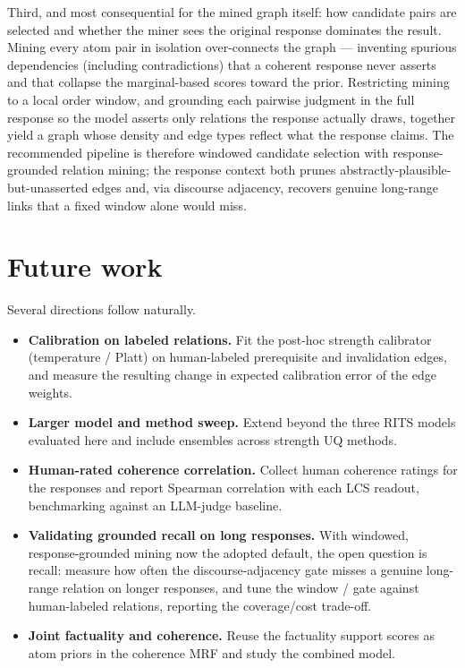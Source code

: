 \documentclass[11pt]{article}
\begin{document}
Third, and most consequential for the mined graph itself: how candidate pairs are
selected and whether the miner sees the original response dominates the result.
Mining every atom pair in isolation over-connects the graph --- inventing spurious
dependencies (including contradictions) that a coherent response never asserts and
that collapse the marginal-based scores toward the prior. Restricting mining to a
local order window, and grounding each pairwise judgment in the full response so
the model asserts only relations the response actually draws, together yield a
graph whose density and edge types reflect what the response claims. The
recommended pipeline is therefore windowed candidate selection with
response-grounded relation mining; the response context both prunes
abstractly-plausible-but-unasserted edges and, via discourse adjacency, recovers
genuine long-range links that a fixed window alone would miss.

\section{Future work}

Several directions follow naturally.
\begin{itemize}
  \item \textbf{Calibration on labeled relations.} Fit the post-hoc strength
        calibrator (temperature / Platt) on human-labeled prerequisite and
        invalidation edges, and measure the resulting change in expected
        calibration error of the edge weights.
  \item \textbf{Larger model and method sweep.} Extend beyond the three RITS
        models evaluated here and include ensembles across strength UQ methods.
  \item \textbf{Human-rated coherence correlation.} Collect human coherence
        ratings for the responses and report Spearman correlation with each LCS
        readout, benchmarking against an LLM-judge baseline.
  \item \textbf{Validating grounded recall on long responses.} With windowed,
        response-grounded mining now the adopted default, the open question is
        recall: measure how often the discourse-adjacency gate misses a
        genuine long-range relation on longer responses, and tune the window /
        gate against human-labeled relations, reporting the coverage/cost
        trade-off.
  \item \textbf{Joint factuality and coherence.} Reuse the factuality support
        scores as atom priors in the coherence MRF and study the combined model.
\end{itemize}
\end{document}
